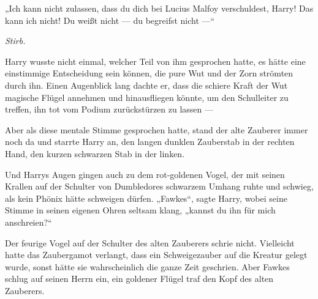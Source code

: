 „Ich kann nicht zulassen, dass du dich bei Lucius Malfoy verschuldest, Harry! Das kann ich nicht! Du weißt nicht — du begreifst nicht —“

\emph{Stirb.}

Harry wusste nicht einmal, welcher Teil von ihm gesprochen hatte, es hätte eine einstimmige Entscheidung sein können, die pure Wut und der Zorn strömten durch ihn. Einen Augenblick lang dachte er, dass die schiere Kraft der Wut magische Flügel annehmen und hinausfliegen könnte, um den Schulleiter zu treffen, ihn tot vom Podium zurückstürzen zu lassen —

Aber als diese mentale Stimme gesprochen hatte, stand der alte Zauberer immer noch da und starrte Harry an, den langen dunklen Zauberstab in der rechten Hand, den kurzen schwarzen Stab in der linken.

Und Harrys Augen gingen auch zu dem rot-goldenen Vogel, der mit seinen Krallen auf der Schulter von Dumbledores schwarzem Umhang ruhte und schwieg, als kein Phönix hätte schweigen dürfen.
„Fawkes“, sagte Harry, wobei seine Stimme in seinen eigenen Ohren seltsam klang, „kannst du ihn für mich anschreien?“

Der feurige Vogel auf der Schulter des alten Zauberers schrie nicht. Vielleicht hatte das Zaubergamot verlangt, dass ein Schweigezauber auf die Kreatur gelegt wurde, sonst hätte sie wahrscheinlich die ganze Zeit geschrien. Aber Fawkes schlug auf seinen Herrn ein, ein goldener Flügel traf den Kopf des alten Zauberers.

